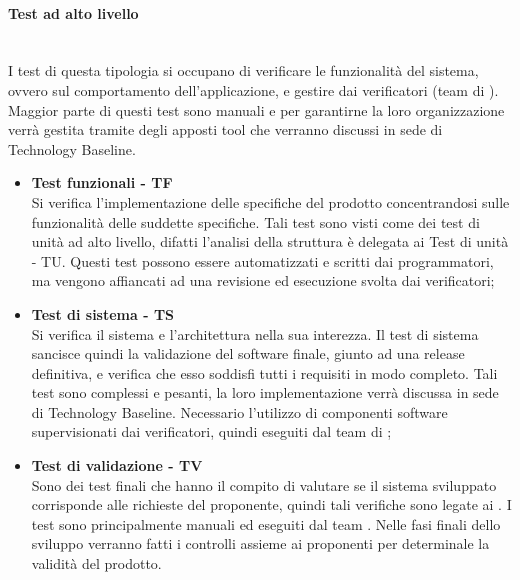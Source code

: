 \paragraph{Test ad alto livello}\mbox{}\\[0.4cm]
I test di questa tipologia si occupano di verificare le funzionalità del sistema, ovvero sul comportamento dell'applicazione, e gestire dai verificatori (team di ). Maggior parte di questi test sono manuali e per garantirne la loro organizzazione verrà gestita tramite degli apposti tool che verranno discussi in sede di Technology Baseline.
\begin{itemize}
	\item \textbf{Test funzionali - TF}\\
	Si verifica l'implementazione delle specifiche del prodotto concentrandosi sulle funzionalità delle suddette specifiche. Tali test sono visti come dei test di unità ad alto livello, difatti l'analisi della struttura è delegata ai Test di unità - TU.
	Questi test possono essere automatizzati e scritti dai programmatori, ma vengono affiancati ad una revisione ed esecuzione svolta dai verificatori;
	\item \textbf{Test di sistema - TS}\\
	Si verifica il sistema e l'architettura nella sua interezza. Il test di sistema sancisce quindi la validazione del software finale, giunto ad una release definitiva, e verifica che esso soddisfi tutti i requisiti in modo completo. Tali test sono complessi e pesanti, la loro implementazione verrà discussa in sede di Technology Baseline. Necessario l'utilizzo di componenti software supervisionati dai verificatori, quindi eseguiti dal team di ;
	\item \textbf{Test di validazione - TV}\\
	Sono dei test finali che hanno il compito di valutare se il sistema sviluppato corrisponde alle richieste del proponente, quindi tali verifiche sono legate ai . I test sono principalmente manuali ed eseguiti dal team . Nelle fasi finali dello sviluppo verranno fatti i controlli assieme ai proponenti per determinale la validità del prodotto. 
\end{itemize} 
